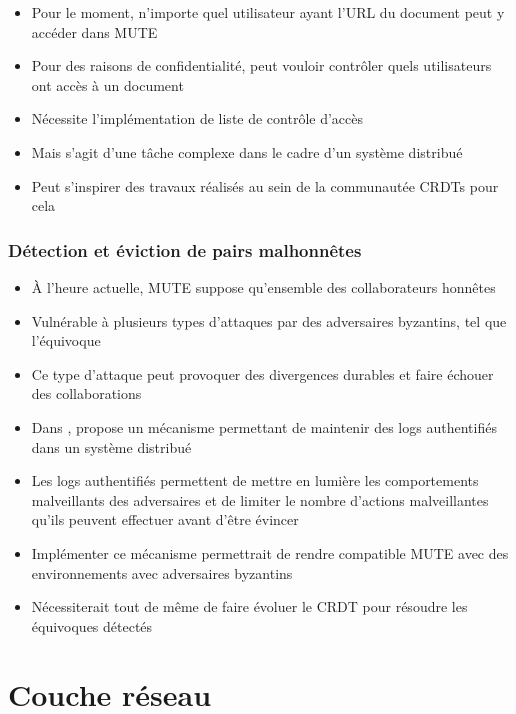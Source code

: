 \documentclass[12pt]{thesul}
\begin{document}
\begin{itemize}
  \item Pour le moment, n'importe quel utilisateur ayant l'URL du document peut y accéder dans MUTE
  \item Pour des raisons de confidentialité, peut vouloir contrôler quels utilisateurs ont accès à un document
  \item Nécessite l'implémentation de liste de contrôle d'accès
  \item Mais s'agit d'une tâche complexe dans le cadre d'un système distribué
  \item Peut s'inspirer des travaux réalisés au sein de la communautée \acp{CRDT} \cite{2021-access-control-crdts} pour cela
\end{itemize}

\subsubsection{Détection et éviction de pairs malhonnêtes}

\begin{itemize}
  \item À l'heure actuelle, MUTE suppose qu'ensemble des collaborateurs honnêtes
  \item Vulnérable à plusieurs types d'attaques par des adversaires byzantins, tel que l'équivoque
  \item Ce type d'attaque peut provoquer des divergences durables et faire échouer des collaborations
  \item Dans \cite{2018-prunable-authenticated-log, 2021-these-vic}, \citeauthor{2021-these-vic} propose un mécanisme permettant de maintenir des logs authentifiés dans un système distribué
  \item Les logs authentifiés permettent de mettre en lumière les comportements malveillants des adversaires et de limiter le nombre d'actions malveillantes qu'ils peuvent effectuer avant d'être évincer
  \item Implémenter ce mécanisme permettrait de rendre compatible MUTE avec des environnements avec adversaires byzantins
  \item Nécessiterait tout de même de faire évoluer le \ac{CRDT} pour résoudre les équivoques détectés
\end{itemize}

\section{Couche réseau}
\end{document}
